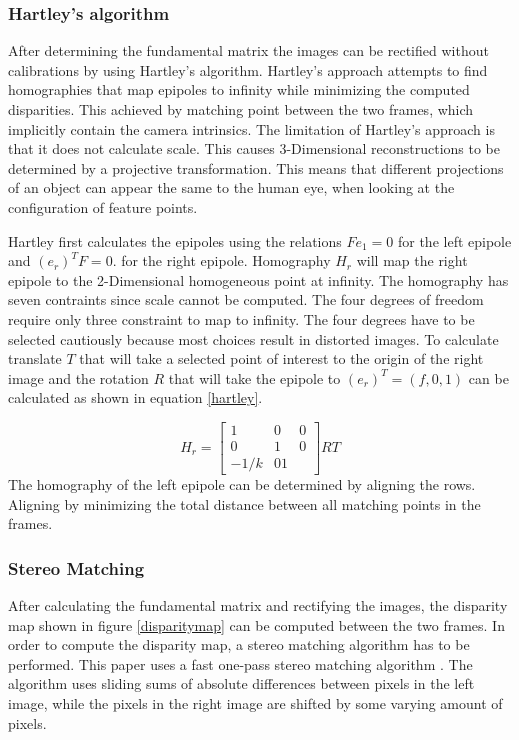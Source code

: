 \documentclass[a4paper]{article}
\begin{document}
\subsubsection{Hartley's algorithm}
After determining the fundamental matrix the images can be rectified without calibrations by using Hartley's algorithm. Hartley's approach attempts to find homographies \cite{Trucco1998} that map epipoles to infinity while minimizing the computed disparities. This achieved by matching point between the two frames, which implicitly contain the camera intrinsics. The limitation of Hartley's approach is that it does not calculate scale. This causes 3-Dimensional reconstructions to be determined by a projective transformation. This means 
that different projections of an object can appear the same to the human eye, when looking at the configuration of feature points.

Hartley first calculates the epipoles using the relations $Fe_1 = 0$ for the left epipole and $(e_r)^T F = 0$. for the right epipole. Homography $H_r$ will map the right epipole to the 2-Dimensional homogeneous point at infinity. The homography has seven contraints since scale cannot be computed. The four degrees of freedom require only three constraint to map to infinity. The four degrees have to be selected cautiously because most choices result in distorted images. 
To calculate translate $T$ that will take a selected point of interest to the origin of the right image and the rotation $R$ that will take the epipole to $(e_r)^T = ( f,0,1)$ can be calculated as shown in equation \ref{hartley}.

\begin{equation}
\label{hartley}
H_r = \begin{bmatrix}
1 & 0 & 0\\
0 & 1 & 0\\
-1/k & 0 1
\end{bmatrix}RT
\end{equation}
The homography of the left epipole can be determined by aligning the rows. Aligning by minimizing the total distance between all matching points in the frames.

\subsubsection{Stereo Matching}
After calculating the fundamental matrix and rectifying the images, the disparity map shown in figure \ref{disparitymap} can be computed between the two frames. In order to compute the disparity map, a stereo matching algorithm has to be performed. This paper uses a fast one-pass stereo matching algorithm \cite{Gutmann2000}. The algorithm uses sliding sums of absolute differences between pixels in the left image, while the pixels in the right image are shifted by some varying amount of pixels.
\end{document}
